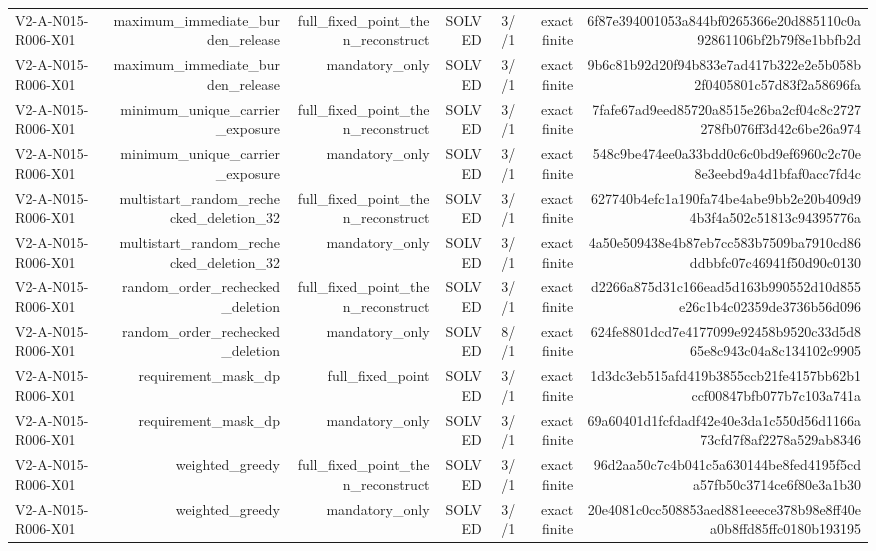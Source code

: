 {\begin{longtable}{lrrrrrr}
V2-A-N015-R006-X01 & maximum\_immediate\_burden\_release & full\_fixed\_point\_then\_reconstruct & SOLVED & 3//1 & exact finite & 6f87e394001053a844bf0265366e20d885110c0a92861106bf2b79f8e1bbfb2d \\
V2-A-N015-R006-X01 & maximum\_immediate\_burden\_release & mandatory\_only & SOLVED & 3//1 & exact finite & 9b6c81b92d20f94b833e7ad417b322e2e5b058b2f0405801c57d83f2a58696fa \\
V2-A-N015-R006-X01 & minimum\_unique\_carrier\_exposure & full\_fixed\_point\_then\_reconstruct & SOLVED & 3//1 & exact finite & 7fafe67ad9eed85720a8515e26ba2cf04c8c2727278fb076ff3d42c6be26a974 \\
V2-A-N015-R006-X01 & minimum\_unique\_carrier\_exposure & mandatory\_only & SOLVED & 3//1 & exact finite & 548c9be474ee0a33bdd0c6c0bd9ef6960c2c70e8e3eebd9a4d1bfaf0acc7fd4c \\
V2-A-N015-R006-X01 & multistart\_random\_rechecked\_deletion\_32 & full\_fixed\_point\_then\_reconstruct & SOLVED & 3//1 & exact finite & 627740b4efc1a190fa74be4abe9bb2e20b409d94b3f4a502c51813c94395776a \\
V2-A-N015-R006-X01 & multistart\_random\_rechecked\_deletion\_32 & mandatory\_only & SOLVED & 3//1 & exact finite & 4a50e509438e4b87eb7cc583b7509ba7910cd86ddbbfc07c46941f50d90c0130 \\
V2-A-N015-R006-X01 & random\_order\_rechecked\_deletion & full\_fixed\_point\_then\_reconstruct & SOLVED & 3//1 & exact finite & d2266a875d31c166ead5d163b990552d10d855e26c1b4c02359de3736b56d096 \\
V2-A-N015-R006-X01 & random\_order\_rechecked\_deletion & mandatory\_only & SOLVED & 8//1 & exact finite & 624fe8801dcd7e4177099e92458b9520c33d5d865e8c943c04a8c134102c9905 \\
V2-A-N015-R006-X01 & requirement\_mask\_dp & full\_fixed\_point & SOLVED & 3//1 & exact finite & 1d3dc3eb515afd419b3855ccb21fe4157bb62b1ccf00847bfb077b7c103a741a \\
V2-A-N015-R006-X01 & requirement\_mask\_dp & mandatory\_only & SOLVED & 3//1 & exact finite & 69a60401d1fcfdadf42e40e3da1c550d56d1166a73cfd7f8af2278a529ab8346 \\
V2-A-N015-R006-X01 & weighted\_greedy & full\_fixed\_point\_then\_reconstruct & SOLVED & 3//1 & exact finite & 96d2aa50c7c4b041c5a630144be8fed4195f5cda57fb50c3714ce6f80e3a1b30 \\
V2-A-N015-R006-X01 & weighted\_greedy & mandatory\_only & SOLVED & 3//1 & exact finite & 20e4081c0cc508853aed881eeece378b98e8ff40ea0b8ffd85ffc0180b193195 \\

\end{longtable}}
